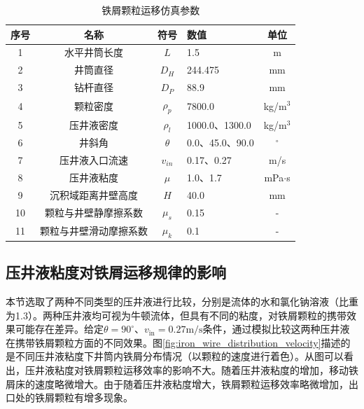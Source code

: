 \begin{table}[htbp]
    \centering
    \caption{铁屑颗粒运移仿真参数}
    \label{tab:simulation_params}
    \begin{tabularx}{.9\textwidth}{cccXc} 
        \toprule %
        序号 & 名称 & 符号 & 数值 & 单位 \\ 
        \midrule %
        
        1 & 水平井筒长度 & $L$ & 1.5 & m \\
        2 & 井筒直径 & $D_H$ & 244.475 & mm \\
        3 & 钻杆直径 & $D_P$ & 88.9 & mm \\
        4 & 颗粒密度 & $\rho_p$ & 7800.0 & kg/m$^3$ \\
        5 & 压井液密度 & $\rho_l$ & 1000.0、1300.0 & kg/m$^3$ \\
        6 & 井斜角 & $\theta$ & 0.0、45.0、90.0 & $^\circ$ \\
        7 & 压井液入口流速 & $v_{in}$ & 0.17、0.27 & m/s \\
        8 & 压井液粘度 & $\mu$ & 1.0、1.7 & mPa$\cdot$s \\
        9 & 沉积域距离井壁高度 & $H$ & 40.0 & mm \\
        10 & 颗粒与井壁静摩擦系数 & $\mu_s$ & 0.15 & - \\
        11 & 颗粒与井壁滑动摩擦系数 & $\mu_k$ & 0.1 & - \\
        
        \bottomrule %
    \end{tabularx}
\end{table}

\subsection{压井液粘度对铁屑运移规律的影响}
本节选取了两种不同类型的压井液进行比较，分别是流体的水和氯化钠溶液（比重为1.3）。两种压井液均可视为牛顿流体，但具有不同的粘度，对铁屑颗粒的携带效果可能存在差异。给定$\theta=90^\circ$、$v_{\mathrm{in}}=0.27\mathrm{m/s}$条件，通过模拟比较这两种压井液在携带铁屑颗粒方面的不同效果。图\ref{fig:iron_wire_distribution_velocity}描述的是不同压井液粘度下井筒内铁屑分布情况（以颗粒的速度进行着色）。从图可以看出，压井液粘度对铁屑颗粒运移效率的影响不大。随着压井液粘度的增加，移动铁屑床的速度略微增大。由于随着压井液粘度增大，铁屑颗粒运移效率略微增加，出口处的铁屑颗粒有增多现象。

